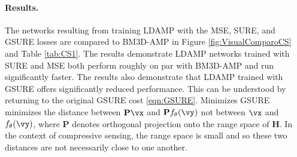\documentclass{article}
\begin{document}
\paragraph{Results.}%
The networks resulting from training LDAMP with the MSE, SURE, and GSURE losses are compared to BM3D-AMP \cite{DAMP} in Figure \ref{fig:VisualComparoCS} and Table \ref{tab:CS1}. The results demonstrate LDAMP networks trained with SURE and MSE both perform roughly on par with BM3D-AMP and run significantly faster. 
The results also demonstrate that LDAMP trained with GSURE offers significantly reduced performance. This can be understood by returning to the original GSURE cost \eqref{eqn:GSURE}. Minimizes GSURE minimizes the distance between $\mathbf{P}\vx$ and $\mathbf{P}f_\theta(\vy)$ not between $\vx$ and $f_\theta(\vy)$, where $\mathbf{P}$ denotes orthogonal projection onto the range space of $\mathbf{H}$.
In the context of compressive sensing, the range space is small and so these two distances are not necessarily close to one another.
\end{document}
